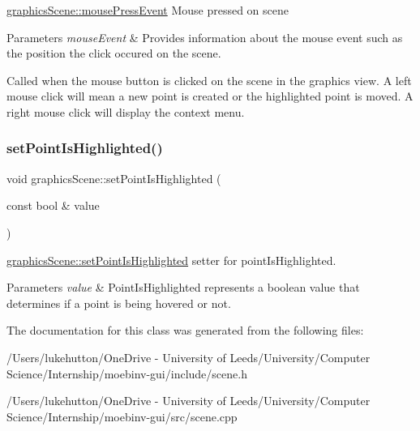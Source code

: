 \mbox{\hyperlink{classgraphics_scene_a45ca641319ec6accb1574f52539e7517}{graphics\+Scene\+::mouse\+Press\+Event}} Mouse pressed on scene 


\begin{DoxyParams}{Parameters}
{\em mouse\+Event} & Provides information about the mouse event such as the position the click occured on the scene.\\
\hline
\end{DoxyParams}
Called when the mouse button is clicked on the scene in the graphics view. A left mouse click will mean a new point is created or the highlighted point is moved. A right mouse click will display the context menu. \mbox{\label{classgraphics_scene_a96915f909391e379b8c6c880d1d3acc6}} 
\subsubsection{\texorpdfstring{set\+Point\+Is\+Highlighted()}{setPointIsHighlighted()}}
{\footnotesize\ttfamily void graphics\+Scene\+::set\+Point\+Is\+Highlighted (\begin{DoxyParamCaption}\item[{const bool \&}]{value }\end{DoxyParamCaption})}



\mbox{\hyperlink{classgraphics_scene_a96915f909391e379b8c6c880d1d3acc6}{graphics\+Scene\+::set\+Point\+Is\+Highlighted}} setter for point\+Is\+Highlighted. 


\begin{DoxyParams}{Parameters}
{\em value} & Point\+Is\+Highlighted represents a boolean value that determines if a point is being hovered or not. \\
\hline
\end{DoxyParams}


The documentation for this class was generated from the following files\+:\begin{DoxyCompactItemize}
\item 
/\+Users/lukehutton/\+One\+Drive -\/ University of Leeds/\+University/\+Computer Science/\+Internship/moebinv-\/gui/include/scene.\+h\item 
/\+Users/lukehutton/\+One\+Drive -\/ University of Leeds/\+University/\+Computer Science/\+Internship/moebinv-\/gui/src/scene.\+cpp\end{DoxyCompactItemize}
